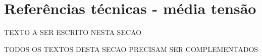 \section{Referências técnicas - média tensão} \label{section: tech references medium}
TEXTO A SER ESCRITO NESTA SECAO

TODOS OS TEXTOS DESTA SECAO PRECISAM SER COMPLEMENTADOS




